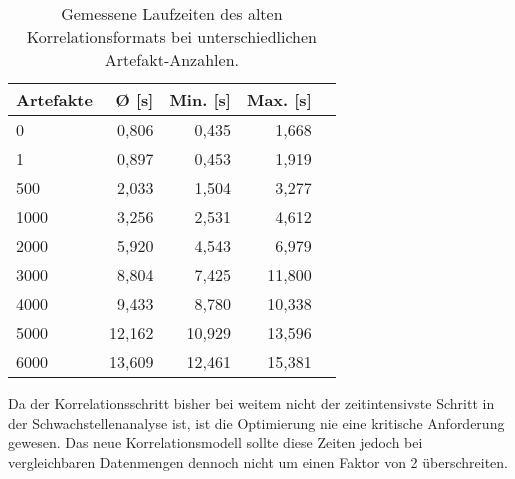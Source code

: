 \begin{table}[h!]
    \centering
    \label{tab:old-correlation-performance}
    \begin{tabular}{l r r r r}
        \toprule
        \textbf{Artefakte} & \textbf{Ø [s]} & \textbf{Min. [s]} & \textbf{Max. [s]} \\
        \midrule
        0                  & 0,806          & 0,435             & 1,668             \\
        1                  & 0,897          & 0,453             & 1,919             \\
        500                & 2,033          & 1,504             & 3,277             \\
        1000               & 3,256          & 2,531             & 4,612             \\
        2000               & 5,920          & 4,543             & 6,979             \\
        3000               & 8,804          & 7,425             & 11,800            \\
        4000               & 9,433          & 8,780             & 10,338            \\
        5000               & 12,162         & 10,929            & 13,596            \\
        6000               & 13,609         & 12,461            & 15,381            \\
        \bottomrule
    \end{tabular}
    \caption{Gemessene Laufzeiten des alten Korrelationsformats bei unterschiedlichen Artefakt-Anzahlen.}
\end{table}

Da der Korrelationsschritt bisher bei weitem nicht der zeitintensivste Schritt in der Schwachstellenanalyse ist, ist die Optimierung nie eine kritische Anforderung gewesen.
Das neue Korrelationsmodell sollte diese Zeiten jedoch bei vergleichbaren Datenmengen dennoch nicht um einen Faktor von 2 überschreiten.

